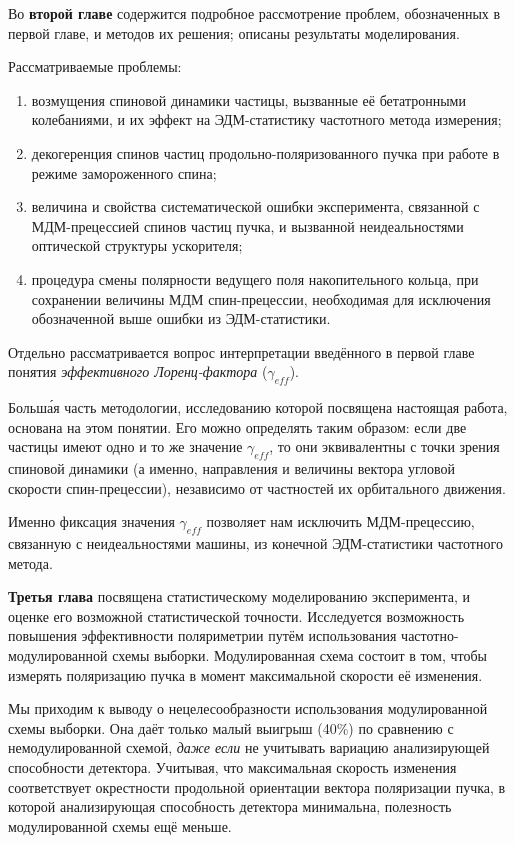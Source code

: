 Во \textbf{второй главе} содержится подробное рассмотрение проблем, обозначенных в первой главе, и методов их решения; описаны результаты моделирования. 

Рассматриваемые проблемы:
\begin{enumerate}
	\item возмущения спиновой динамики частицы, вызванные её бетатронными колебаниями, и их эффект на ЭДМ-статистику частотного метода измерения;
	\item декогеренция спинов частиц продольно-поляризованного пучка при работе в режиме замороженного спина;
	\item величина и свойства систематической ошибки эксперимента, связанной с МДМ-прецессией спинов частиц пучка, и вызванной неидеальностями оптической структуры ускорителя;
	\item процедура смены полярности ведущего поля накопительного кольца, при сохранении величины МДМ спин-прецессии, необходимая для исключения обозначенной выше ошибки из ЭДМ-статистики.
\end{enumerate}

Отдельно рассматривается вопрос интерпретации введённого в первой главе понятия \emph{эффективного Лоренц-фактора} ($\gamma_{eff}$). 

Больш\'{а}я часть методологии, исследованию которой посвящена настоящая работа, основана на этом понятии. Его можно определять таким образом: если две частицы имеют одно и то же значение $\gamma_{eff}$, то они эквивалентны с точки зрения спиновой динамики (а именно, направления и величины вектора угловой скорости спин-прецессии), независимо от частностей их орбитального движения. 

Именно фиксация значения $\gamma_{eff}$ позволяет нам исключить МДМ-прецессию, связанную с неидеальностями машины, из конечной ЭДМ-статистики частотного метода.

\textbf{Третья глава} посвящена статистическому моделированию эксперимента, 
и оценке его возможной статистической точности. Исследуется возможность повышения эффективности
поляриметрии путём использования частотно-модулированной схемы выборки. Модулированная схема 
состоит в том, чтобы измерять поляризацию пучка в момент максимальной скорости её изменения.

Мы приходим к выводу о нецелесообразности использования модулированной схемы выборки. Она даёт только
малый выигрыш (40\%) по сравнению с немодулированной схемой, \emph{даже если} не учитывать вариацию 
анализирующей способности детектора. Учитывая, что максимальная скорость изменения соответствует
окрестности продольной ориентации вектора поляризации пучка, в которой анализирующая способность 
детектора минимальна, полезность модулированной схемы ещё меньше.

